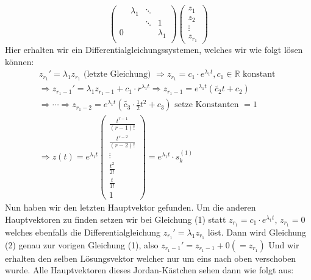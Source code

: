 \documentclass[a4paper]{article}
\newcommand{\R}{\mathbb{R}}
\begin{document}
\begin{enumerate}
\begin{enumerate}
\[\begin{pmatrix}
					  & \lambda_1 & \ddots & \\
					& & \ddots & 1 \\
					0 & & & \lambda_1 \\
				\end{pmatrix} 
				\begin{pmatrix} 
					z_1 \\
					z_2 \\
					\vdots \\
					z_{r_1}
				\end{pmatrix} 
				\]
				Hier erhalten wir ein Differentialgleichungssystemen, welches
				wir wie folgt lösen können:
				\setcounter{equation}{0}
				\begin{gather}
					z_{r_1}' = \lambda_1 z_{r_1}
					\text{ (letzte Gleichung) }
					\Rightarrow z_{r_1}
					= c_{1} \cdot e ^{\lambda_1 t},
					c_{1} \in \R \text{ konstant }
					\\
					\Rightarrow 
					z_{r_1 - 1}' = \lambda_1 z_{r_1 - 1}
					+ c_{1} \cdot r ^{\lambda_1 t}
					\Rightarrow z_{r_1 - 1} = 
					e ^{\lambda_1 t} \left(
						\tilde{c_2} t + c_2
					\right) \\
					\Rightarrow
					\cdots \Rightarrow
					z_{r_1 -2} = e ^{\lambda_1 t} \left(
						\tilde{c_3} \cdot \frac{ 1 }{ 2 } t^2
						+ c_3
					\right)  \text{ setze Konstanten } =1 \\
					\Rightarrow z(t) =
					e ^{\lambda_1 t} \begin{pmatrix} 
						\frac{ t ^{r-1} }{ (r-1)! } \\[1em]
						\frac{ t ^{r-2} }{ (r-2)! } \\[1em]
						\vdots \\[1em]
						\frac{ t ^2 }{ 2! } \\[1em]
						\frac{ t }{ 1! } \\[1em]
						1 
					\end{pmatrix} 
					= e ^{\lambda_1 t}
					\cdot s_k ^{(1)}
				\end{gather}
				Nun haben wir den letzten Hauptvektor gefunden. Um die anderen
				Hauptvektoren zu finden setzen wir bei Gleichung (1)
				statt $z_{r_1} = c_1 \cdot e ^{\lambda_1 t}$,
				$z_{r_1} = 0$ welches ebenfalls die Differentialgleichung
				$z_{r_1}' = \lambda_1 z_{r_1}$ löst.
				Dann wird Gleichung (2) genau zur vorigen Gleichung (1), also
				$z_{r_1 - 1}' = z_{r_1 - 1} + 0 (= z_{r_1})$
				Und wir erhalten den selben Lösungsvektor welcher nur um
				eins nach oben verschoben wurde. Alle Hauptvektoren
				dieses Jordan-Kästchen sehen dann wie folgt aus:

\end{enumerate}
\end{enumerate}
\end{document}
